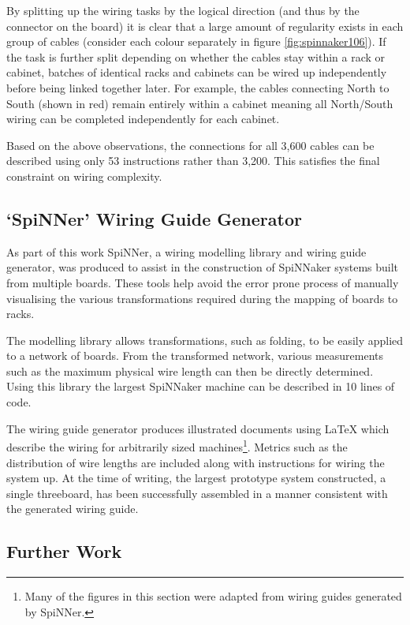 			By splitting up the wiring tasks by the logical direction (and thus by the
			connector on the board) it is clear that a large amount of regularity
			exists in each group of cables (consider each colour separately in figure
			\ref{fig:spinnaker106}). If the task is further split depending on whether
			the cables stay within a rack or cabinet, batches of identical racks and
			cabinets can be wired up independently before being linked together later.
			For example, the cables connecting North to South (shown in red) remain
			entirely within a cabinet meaning all North/South wiring can be completed
			independently for each cabinet.
			
			Based on the above observations, the connections for all 3,600 cables can
			be described using only 53 instructions rather than 3,200. This satisfies
			the final constraint on wiring complexity.
		
		\subsection{`SpiNNer' Wiring Guide Generator}
			
			As part of this work SpiNNer, a wiring modelling library and wiring guide
			generator, was produced to assist in the construction of SpiNNaker systems
			built from multiple boards. These tools help avoid the error prone process
			of manually visualising the various transformations required during the
			mapping of boards to racks.
			
			The modelling library allows transformations, such as folding, to be
			easily applied to a network of boards. From the transformed network,
			various measurements such as the maximum physical wire length can then be
			directly determined. Using this library the largest SpiNNaker machine can
			be described in 10 lines of code.
			
			The wiring guide generator produces illustrated documents using \LaTeX{}
			which describe the wiring for arbitrarily sized machines\footnote{Many of
			the figures in this section were adapted from wiring guides generated by
			SpiNNer.}. Metrics such as the distribution of wire lengths are included
			along with instructions for wiring the system up. At the time of writing,
			the largest prototype system constructed, a single threeboard, has been
			successfully assembled in a manner consistent with the generated wiring
			guide.
		
		\subsection{Further Work}
			
